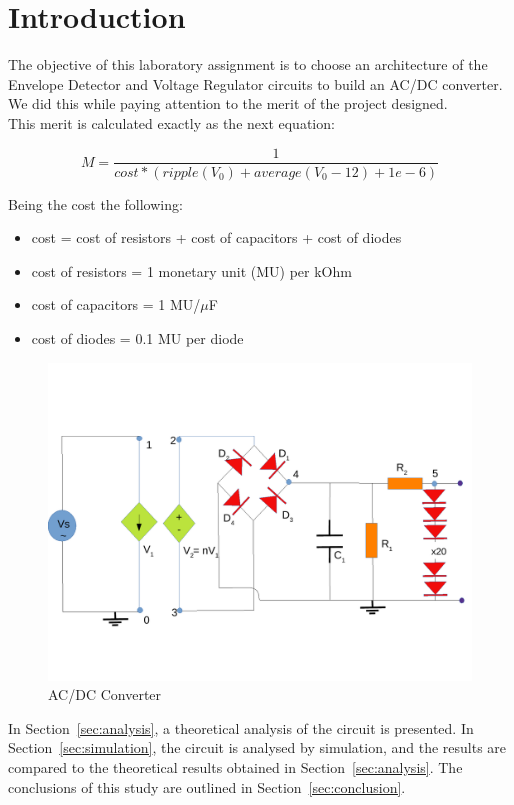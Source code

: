 \newpage
\section{Introduction}
\label{sec:introduction}

The objective of this laboratory assignment is to choose an architecture of the Envelope Detector and Voltage Regulator circuits to build an AC/DC converter. We did this while paying attention to the merit of the project designed.\\
This merit is calculated exactly as the next equation:

\begin{equation} 
M = \frac{1}{cost*(ripple(V_{0}) + average(V_{0}-12) + 1e-6)}
\label{eq1}
\end{equation}

Being the cost the following:
\begin{itemize}
	\item cost = cost of resistors  + cost of capacitors + cost of diodes
	\item cost of resistors = 1 monetary unit (MU) per kOhm
	\item cost of capacitors = 1 MU/$\mu$F
	\item cost of diodes = 0.1 MU per diode
	
\end{itemize}

\begin{figure}[H] 
\centering
\includegraphics[width=\textwidth]{lab3draw.pdf} 
\caption{AC/DC Converter}
\label{fig:first}

\end{figure}

In Section~\ref{sec:analysis}, a theoretical analysis of the circuit is
presented. In Section~\ref{sec:simulation}, the circuit is analysed by
simulation, and the results are compared to the theoretical results obtained in
Section~\ref{sec:analysis}. The conclusions of this study are outlined in
Section~\ref{sec:conclusion}. \\



